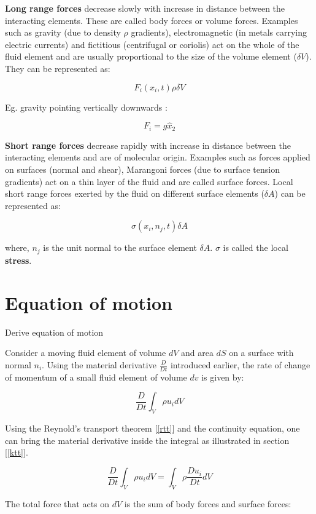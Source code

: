 {\bf Long range forces} decrease slowly with increase in distance between the interacting elements. These are called body forces or volume forces. Examples such as gravity (due to density $\rho$ gradients), electromagnetic (in metals carrying electric currents) and fictitious (centrifugal or coriolis) act on the whole of the fluid element and are usually proportional to the size of the volume element ($\delta V$). They can be represented as:

$$ F_i(x_i,t) \rho \delta V $$

Eg. gravity pointing vertically downwards :

$$ F_i = g \hat{x}_2 $$

{\bf Short range forces} decrease rapidly with increase in distance between the interacting elements and are of molecular origin. Examples such as forces applied on surfaces (normal and shear), Marangoni forces (due to surface tension gradients) act on a thin layer of the fluid and are called surface forces. Local short range forces exerted by the fluid on different surface elements ($\delta A$) can be represented as:

$$ \sigma(x_i, n_j, t) \delta A $$

where, $n_j$ is the unit normal to the surface element $\delta A$. $\sigma$ is called the local {\bf stress}.

\section{Equation of motion}

\begin {lo3} 
Derive equation of motion
\end {lo3}

Consider a moving fluid element of volume $dV$ and area $dS$ on a surface with normal $n_i$. Using the material derivative $\frac{D}{Dt}$ introduced earlier, the rate of change of momentum of a small fluid element of volume $dv$ is given by:

$$ \frac{D}{Dt} \int_{V}{\rho u_i dV} $$

Using the Reynold's transport theorem  [\ref{rtt}] and the continuity equation, one can bring the material derivative inside the integral as illustrated in section [\ref{ktt}]. 

$$ \frac{D}{Dt} \int_{V}{\rho u_i dV} =  \int_{V}{\rho \frac{Du_i}{Dt} dV} $$

The total force that acts on $dV$ is the sum of body forces and surface forces:

